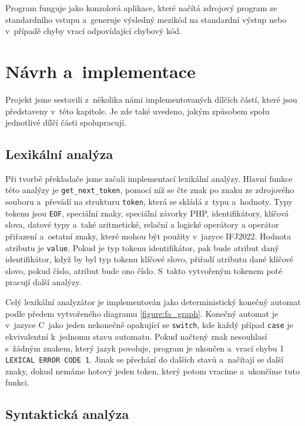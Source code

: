 \documentclass[a4paper, 12pt]{article}
\begin{document}
	Program funguje jako konzolová aplikace, které načítá zdrojový program ze standardního vstupu a~generuje
	výsledný mezikód na standardní výstup nebo v~případě chyby vrací odpovídající chybový kód.



	\section{Návrh a~implementace}

	Projekt jsme sestavili z~několika námi implementovaných dílčích částí, které jsou představeny v~této kapitole.
	Je zde také uvedeno, jakým způsobem spolu jednotlivé dílčí části spolupracují.


	\subsection{Lexikální analýza}

	Při tvorbě překladače jsme začali implementací lexikální analýzy. Hlavní funkce této analýzy je \texttt{get\_next\_token},
	pomocí níž se čte znak po znaku ze zdrojového souboru a~převádí na strukturu \texttt{token}, která se skládá z~typu a~hodnoty.
	Typy tokenu jsou \texttt{EOF}, speciální znaky, speciální závorky PHP, identifikátory, klíčová slova, datové typy a~také aritmetické, relační a logické operátory a operátor přiřazení a~ostatní znaky, které mohou být použity v~jazyce IFJ2022.
	Hodnota atributu je
	\texttt{value}. Pokud je typ tokenu identifikátor, pak bude atribut daný identifikátor,
	když by byl typ tokenu klíčové slovo, přiřadí atributu dané klíčové slovo, pokud číslo, atribut bude ono číslo. S~takto vytvořeným tokenem poté pracují další analýzy.

	Celý lexikální analyzátor je implementován jako deterministický konečný automat podle předem vytvořeného diagramu
	\ref{figure:fa_graph}. Konečný automat je v~jazyce C~jako jeden nekonečně opakující se \texttt{switch}, kde každý případ
	\texttt{case} je ekvivalentní k~jednomu stavu automatu. Pokud načtený znak nesouhlasí s~žádným znakem, který jazyk povoluje,
	program je ukončen a~vrací chybu 1 \texttt{LEXICAL ERROR CODE 1}. Jinak se přechází do dalších stavů a~načítají se další znaky, dokud nemáme hotový jeden
	token, který potom vracíme a~ukončíme tuto funkci.


	\subsection{Syntaktická analýza}
\end{document}
